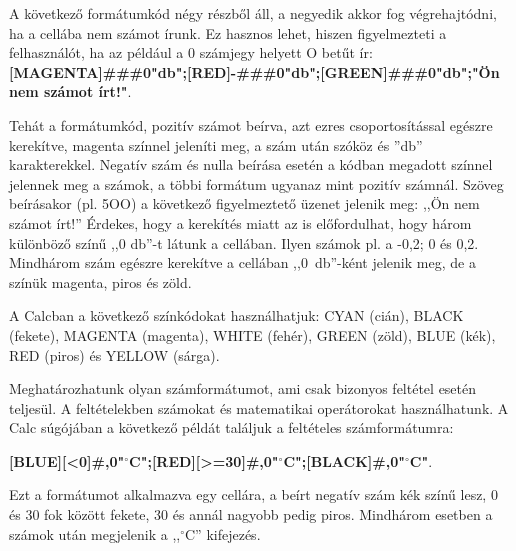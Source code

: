 A következő formátumkód négy részből áll, a negyedik
akkor fog végrehajtódni, ha a cellába nem számot írunk. Ez
hasznos lehet, hiszen figyelmezteti a felhasználót, ha az
például a 0 számjegy helyett O betűt ír:\\
{\sffamily\bfseries
[MAGENTA]\#\#\#0"db";[RED]-\#\#\#0"db";[GREEN]\#\#\#0"db";"Ön nem számot írt!"}.

Tehát a formátumkód, pozitív számot beírva, azt ezres
csoportosítással egészre kerekítve, magenta színnel
jeleníti meg, a szám után szóköz és
''db'' karakterekkel. Negatív
szám és nulla beírása esetén a kódban megadott színnel
jelennek meg a számok, a többi formátum ugyanaz mint pozitív
számnál. Szöveg beírásakor (pl. 5OO) a következő
figyelmeztető üzenet jelenik meg: ,,Ön nem
számot írt!'' Érdekes, hogy a kerekítés
miatt az is előfordulhat, hogy három különböző
színű ,,0 db''-t látunk a
cellában. Ilyen számok pl. a -0,2; 0 és 0,2. Mindhárom szám
egészre kerekítve a cellában ,,0~db''-ként jelenik meg,
de a színük magenta, piros és zöld.

A Calcban a következő színkódokat használhatjuk: CYAN
(cián), BLACK (fekete), MAGENTA (magenta), WHITE (fehér), GREEN
(zöld), BLUE (kék), RED (piros) és YELLOW (sárga).

Meghatározhatunk olyan számformátumot, ami csak bizonyos
feltétel esetén teljesül. A feltételekben számokat és
matematikai operátorokat használhatunk. A Calc súgójában a
következő példát találjuk a feltételes
számformátumra:


{\sffamily\bfseries
[BLUE][<0]\#,0"${}^\circ$C";[RED][>=30]\#,0"${}^\circ$C";[BLACK]\#,0"${}^\circ$C"}.

Ezt a formátumot alkalmazva egy cellára, a beírt negatív szám
kék színű lesz, 0 és 30 fok között fekete, 30 és
annál nagyobb pedig piros. Mindhárom esetben a számok után
megjelenik a ,,$^\circ$C'' kifejezés.

